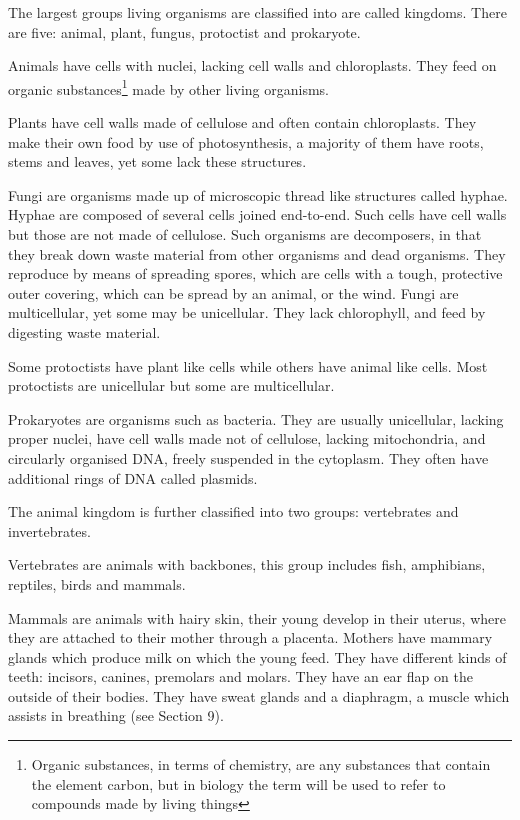 The largest groups living organisms are classified into are called kingdoms. There are five: animal,
plant, fungus, protoctist and prokaryote.

Animals have cells with nuclei, lacking cell walls and chloroplasts. They feed on organic 
substances\footnote{Organic substances, in terms of chemistry, are any substances that contain
the element carbon, but in biology the term will be used to refer to compounds made by living 
things} made by other living organisms.

Plants have cell walls made of cellulose and often contain chloroplasts. They make their own
food by use of photosynthesis, a majority of them have roots, stems and leaves, yet some lack
these structures.

Fungi are organisms made up of microscopic thread like structures called hyphae. Hyphae are composed
of several cells joined end-to-end. Such cells have cell walls but those are not made of cellulose.
Such organisms are decomposers, in that they break down waste material from other organisms and
dead organisms. They reproduce by means of spreading spores, which are cells with a tough, 
protective outer covering, which can be spread by an animal, or the wind. Fungi are multicellular,
yet some may be unicellular. They lack chlorophyll, and feed by digesting waste material.

Some protoctists have plant like cells while others have animal like cells. Most protoctists are
unicellular but some are multicellular.

Prokaryotes are organisms such as bacteria. They are usually unicellular, lacking proper nuclei,
have cell walls made not of cellulose, lacking mitochondria, and circularly organised DNA, freely
suspended in the cytoplasm. They often have additional rings of DNA called plasmids.

The animal kingdom is further classified into two groups: vertebrates and invertebrates.

Vertebrates are animals with backbones, this group includes fish, amphibians, reptiles, birds
and mammals.

Mammals are animals with hairy skin, their young develop in their uterus, where they are attached
to their mother through a placenta. Mothers have mammary glands which produce milk on which the
young feed. They have different kinds of teeth: incisors, canines, premolars and molars. They
have an ear flap on the outside of their bodies. They have sweat glands and a diaphragm, a muscle
which assists in breathing (see Section 9).


